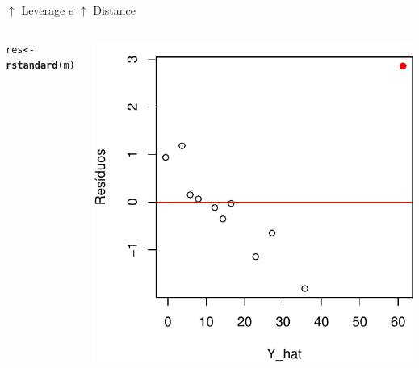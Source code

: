 \documentclass{beamer}\usepackage[]{graphicx}\usepackage[]{color}
\makeatletter
\newcommand{\hlstd}[1]{\textcolor[rgb]{0.345,0.345,0.345}{#1}}%
\newcommand{\hlkwb}[1]{\textcolor[rgb]{0.69,0.353,0.396}{#1}}%
\newcommand{\hlkwd}[1]{\textcolor[rgb]{0.737,0.353,0.396}{\textbf{#1}}}%
\newenvironment{kframe}{%
 \def\at@end@of@kframe{}%
 \ifinner\ifhmode%
  \def\at@end@of@kframe{\end{minipage}}%
  \begin{minipage}{\columnwidth}%
 \fi\fi%
 \def\FrameCommand##1{\hskip\@totalleftmargin \hskip-\fboxsep
 \colorbox{shadecolor}{##1}\hskip-\fboxsep
     \hskip-\linewidth \hskip-\@totalleftmargin \hskip\columnwidth}%
 \MakeFramed {\advance\hsize-\width
   \@totalleftmargin\z@ \linewidth\hsize
   \@setminipage}}%
 {\par\unskip\endMakeFramed%
 \at@end@of@kframe}
\newenvironment{knitrout}{}{} %
\renewenvironment{knitrout}{\setlength{\topsep}{0mm}}{}
\makeatother
\begin{document}
\begin{frame}{$\uparrow$ Leverage e $\uparrow$ Distance}
\begin{columns}[c]
\begin{knitrout}\tiny
{}\color{fgcolor}\begin{kframe}
\begin{alltt}
\hlstd{res} \hlkwb{<-} \hlkwd{rstandard}\hlstd{(m)}
\end{alltt}
\end{kframe}
\includegraphics[width=1\linewidth]{figure/inf0000-1} 

\end{knitrout}

\end{columns}
\end{frame}
\end{document}
